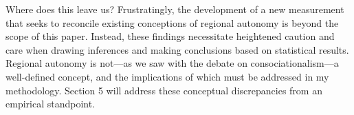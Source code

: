 \documentclass[12pt]{article}
\begin{document}
Where does this leave us? Frustratingly, the development of a new measurement that seeks to reconcile existing conceptions of regional autonomy is beyond the scope of this paper. Instead, these findings necessitate heightened caution and care when drawing inferences and making conclusions based on statistical results. Regional autonomy is not---as we saw with the debate on consociationalism---a well-defined concept, and the implications of which must be addressed in my methodology. Section 5 will address these conceptual discrepancies from an empirical standpoint. 

\begin{table}[ht]
	\centering
	\setlength{\tabcolsep}{10pt}
	\renewcommand{\arraystretch}{1.5} 
\caption{Pearson's Correlation of Regional Autonomy and Authority Measurements}
\end{table}
\end{document}
